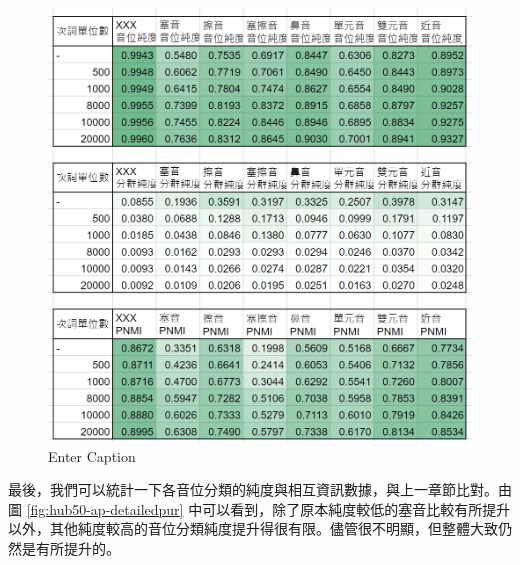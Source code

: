{\begin{figure}
    \centering
    \includegraphics[width=0.5\linewidth]{hub100-ap-detailedpur.png}
    \caption{Enter Caption}
    \label{fig:hub100-ap-detailedpur}
\end{figure}


  
        最後，我們可以統計一下各音位分類的純度與相互資訊數據，與上一章節比對。由圖 \ref{fig:hub50-ap-detailedpur} 中可以看到，除了原本純度較低的塞音比較有所提升以外，其他純度較高的音位分類純度提升得很有限。儘管很不明顯，但整體大致仍然是有所提升的。

{

}}
